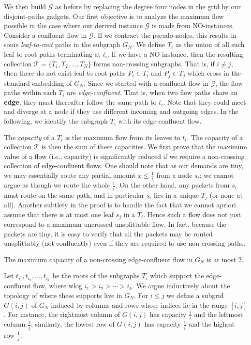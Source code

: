 \documentclass[12pt]{article}
\begin{document}
We then build $\mathcal{G}$ as before by replacing the degree four nodes in the grid by our
disjoint-paths gadgets. Our first objective is to analyze the maximum flow possible in the case
where our derived instance $\mathcal{G}$ is made from NO-instances. Consider a confluent flow in $\mathcal{G}$.
If we contract the pseudo-nodes, this results in some {\em leaf-to-root} paths in the subgraph $G_N$.
We define $T_i$ as the union of all such leaf-to-root paths terminating at $t_i$.
If we have a NO-instance, then  the resulting collection  $\mathcal{T}=\{T_1,T_2,\dots,T_N\}$ forms non-crossing subgraphs.
That is, if $i \neq j$, then there do not exist leaf-to-root paths $P_i \in T_i$ and $P_j \in T_j$
which cross in the standard embedding of $G_N$.
Since we started with a confluent flow in $\mathcal{G}$, the flow paths within each $T_i$ are {\em edge-confluent}.
That is, when two flow paths share an {\bf edge}, they must thereafter follow the same path to $t_i$.
Note that they could meet and diverge at a node if they
use different incoming and outgoing edges.
In the following,
we identify the subgraph $T_i$ with its edge-confluent flow.


The {\em capacity} of a $T_i$ is the maximum flow from its leaves
to $t_i$. The capacity of a collection $\mathcal{T}$ is then the sum of these capacities.
We first prove that the maximum value of a flow (i.e., capacity) is significantly reduced if we require a
non-crossing collection of edge-confluent flows.
One should note that as our demands are tiny, we may essentially route any partial
amount $x \leq \frac{1}{i}$ from a node $s_i$;
we cannot argue as though we route the whole $\frac{1}{i}$. On the other hand, any
packets from $s_i$ must route on the same path, and in particular $s_i$ lies in a unique  $T_j$ (or none at all).
Another subtlety in the proof is to handle the fact that we cannot apriori assume
that there is at most one leaf $s_j$ in a $T_i$.
 Hence such a flow does not just correspond to a maximum uncrossed unsplittable flow. In fact, because the packets are tiny,
 it is easy to verify that all the packets may  be routed unsplittably (not confluently) even if they are required to use non-crossing paths.





\begin{lemma}\label{lemma.maxflow}
The maximum capacity of a non-crossing edge-confluent flow  in $G_N$ is at most $2$.
\end{lemma}
Let $t_{i_1},t_{i_2},...,t_{i_k}$ be the roots of the subgraphs $T_i$ which support
the edge-confluent flow, where wlog $i_1 > i_2 > \cdots >i_k$. We argue inductively about the
topology of where these supports live in $G_N$.
For $i \leq j$ we define a subgrid $G(i,j)$ of $G_N$ induced by columns and rows whose
indices lie in the range $[i,j]$.
For instance, the rightmost column of $G(i,j)$ has capacity $\frac{1}{i}$ and  the
leftmost column $\frac{1}{j}$; similarly, the lowest row of $G(i,j)$ has capacity $\frac{1}{i}$ and  the
highest row $\frac{1}{j}$.
\end{document}
